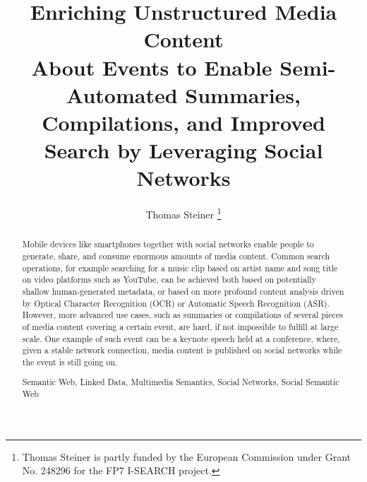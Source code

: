\documentclass[runningheads,a4paper]{llncs}
\newcommand{\keywords}[1]{\par\addvspace\baselineskip
\noindent\keywordname\enspace\ignorespaces#1}
\begin{document}
\mainmatter  %

\title{Enriching Unstructured Media Content\\ About Events to Enable Semi-Automated Summaries, Compilations, and Improved\\ Search by Leveraging Social Networks}


\author{Thomas Steiner%
\thanks{Thomas Steiner is partly funded by the European Commission under Grant No. 248296 for the FP7 I-SEARCH project.}}
%


%
%
\maketitle
\begin{abstract}
Mobile devices like smartphones together with social networks enable people to generate, share, and consume enormous amounts of media content. Common search operations, for example searching for a music clip based on artist name and song title on video platforms such as YouTube, can be achieved both based on potentially shallow human-generated metadata, or based on more profound content analysis driven by Optical Character Recognition (OCR) or Automatic Speech Recognition (ASR). However, more advanced use cases, such as summaries or compilations of several pieces of media content covering a certain event, are hard, if not impossible to fulfill at large scale. One example of such event can be a keynote speech held at a conference, where, given a stable network connection, media content is published on social networks while the event is still going on.
\keywords{Semantic Web, Linked Data, Multimedia Semantics, Social Networks, Social Semantic Web}
\end{abstract}
\end{document}
